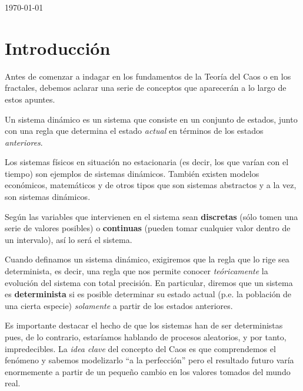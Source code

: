 \begin{titlepage}

{\large \today}\\[1cm] %



\vfill %

\end{titlepage}

\tableofcontents
\newpage

\section{Introducción}
Antes de comenzar a indagar en los fundamentos de la Teoría del Caos o en los fractales, debemos aclarar una serie de conceptos que aparecerán a lo largo de estos apuntes.

\begin{definition}\label{def:sistemaDinamico}
Un sistema dinámico es un sistema que consiste en un conjunto de estados, junto con una regla que determina el estado \emph{actual} en términos de los estados \emph{anteriores}.
\end{definition}

Los sistemas físicos en situación no estacionaria (es decir, los que varían con el tiempo) son ejemplos de sistemas dinámicos. También existen modelos económicos, matemáticos y de otros tipos que son sistemas abstractos y a la vez, son sistemas dinámicos.

Según las variables que intervienen en el sistema sean \textbf{discretas} (sólo tomen una serie de valores posibles) o \textbf{continuas} (pueden tomar cualquier valor dentro de un intervalo), así lo será el sistema.

Cuando definamos un sistema dinámico, exigiremos que la regla que lo rige sea determinista, es decir, una regla que nos permite conocer \emph{teóricamente} la evolución del sistema con total precisión. En particular, diremos que un sistema es \textbf{determinista} si es posible determinar su estado actual (p.e. la población de una cierta especie) \emph{solamente} a partir de los estados anteriores.

Es importante destacar el hecho de que los sistemas han de ser deterministas pues, de lo contrario, estaríamos hablando de procesos aleatorios, y por tanto, impredecibles. La \emph{idea clave} del concepto del Caos es que comprendemos el fenómeno y sabemos modelizarlo ``a la perfección'' pero el resultado futuro varía enormemente a partir de un pequeño cambio en los valores tomados del mundo real.


